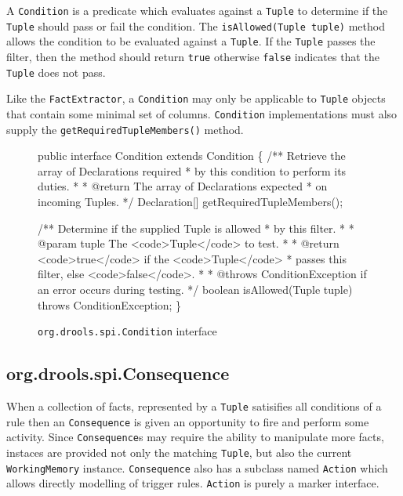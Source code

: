 A \verb|Condition| is a predicate which evaluates against
a \verb|Tuple| to determine if the \verb|Tuple| should pass or
fail the condition. The \verb|isAllowed(Tuple tuple)| method
allows the condition to be evaluated against a \verb|Tuple|.
If the \verb|Tuple| passes the filter, then the method should
return \verb|true| otherwise \verb|false| indicates that
the \verb|Tuple| does not pass.

Like the \verb|FactExtractor|, a
\verb|Condition| may only be applicable to \verb|Tuple|
objects that contain some minimal set of columns.  
\verb|Condition| implementations must also supply
the \verb|getRequiredTupleMembers()| method.

\begin{figure}
\begin{codelisting}
public interface Condition extends Condition
\{
    /** Retrieve the array of Declarations required
     *  by this condition to perform its duties.
     *
     *  @return The array of Declarations expected
     *          on incoming Tuples.
     */
    Declaration[] getRequiredTupleMembers();

    /** Determine if the supplied Tuple is allowed
     *  by this filter.
     *
     *  @param tuple The <code>Tuple</code> to test.
     *
     *  @return <code>true</code> if the <code>Tuple</code>
     *          passes this filter, else <code>false</code>.
     *
     *  @throws ConditionException if an error occurs during testing.
     */
    boolean isAllowed(Tuple tuple) throws ConditionException;
\}
\end{codelisting}
\label{code.Condition}
\caption{\texttt{org.drools.spi.Condition} interface}
\end{figure}

\subsection{org.drools.spi.Consequence}

When a collection of facts, represented by a \verb|Tuple| satisifies
all conditions of a rule then an \verb|Consequence| is given an opportunity
to fire and perform some activity.  Since \verb|Consequence|s may require
the ability to manipulate more facts, instaces are provided not only
the matching \verb|Tuple|, but also the current \verb|WorkingMemory|
instance. \verb|Consequence| also has a subclass named \verb|Action| which allows
directly modelling of trigger rules.  \verb|Action|  is purely a
marker interface.


